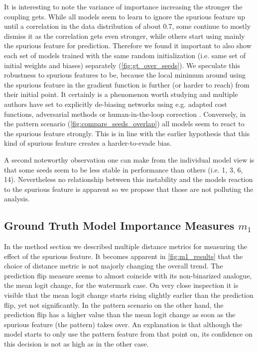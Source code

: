 It is interesting to note the variance of importance increasing the stronger the coupling gets. While all models seem to learn to ignore the spurious feature up until a correlation in the data distribution of about 0.7, some continue to mostly dismiss it as the correlation gets even stronger, while others start using mainly the spurious feature for prediction. Therefore we found it important to also show each set of models trained with the same random initialization (i.e. same set of initial weights and biases) separately (\cref{fig:gt_over_seeds}). We speculate this robustness to spurious features to be, because the local minimum around using the spurious feature in the gradient function is further (or harder to reach) from their initial point. It certainly is a phenomenon worth studying and multiple authors have set to explicitly de-biasing networks using e.g. adapted cost functions, adversarial methods or human-in-the-loop correction \cite{Anders2022,Pahde2023,Reimers2021, Reimers2021b, Dreyer2023a}.
Conversely, in the pattern scenario (\cref{fig:compare_seeds_overlap}) all models seem to react to the spurious feature strongly. This is in line with the earlier hypothesis that this kind of spurious feature creates a harder-to-evade bias.  

A second noteworthy observation one can make from the individual model view is that some seeds seem to be less stable in performance than others (i.e. 1, 3, 6, 14). Nevertheless no relationship between this instability and the models reaction to the spurious feature is apparent so we propose that those are not polluting the analysis.

\subsection{Ground Truth Model Importance Measures $m_1$}
In the method section we described multiple distance metrics for measuring the effect of the spurious feature. It becomes apparent in \cref{fig:m1_results} that the choice of distance metric is not majorly changing the overall trend.
The prediction flip measure seems to almost coincide with its non-binarized analogue, the mean logit change, for the watermark case.
On very close inspection it is visible that the mean logit change starts rising slightly earlier than the prediction flip, yet not significantly.
In the pattern scenario on the other hand, the prediction flip has a higher value than the mean logit change as soon as the spurious feature (the pattern) takes over. An explanation is that although the model starts to only use the pattern feature from that point on, its confidence on this decision is not as high as in the other case.

